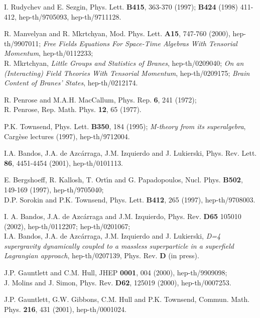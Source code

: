 \documentclass[a4paper,11pt]{article}
\begin{document}
{\begin{thebibliography}{99}
I. Rudychev and E. Sezgin, 
Phys. Lett. {\bf B415},  
363-370 (1997); {\bf B424} (1998) 411-412, 
hep-th/9705093, 
 hep-th/9711128. 

 R. Manvelyan and R. Mkrtchyan, 
Mod. Phys. Lett. {\bf A15}, 747-760 (2000), 
hep-th/9907011; 
{\sl Free Fields Equations For Space-Time Algebras With Tensorial Momentum}, 
hep-th/0112233; \\ 
  R. Mkrtchyan, {\sl Little Groups and Statistics of Branes}, 
hep-th/0209040; {\sl On an (Interacting) Field Theories With 
Tensorial Momentum}, hep-th/0209175; 
{\sl Brain Content of Branes' States}, 
 hep-th/0212174. 


R. Penrose and M.A.H. MacCallum, Phys. Rep. {\bf 6}, 241 (1972); \\
R. Penrose, Rep. Math. Phys. {\bf 12}, 65 (1977).

P.K. Townsend, Phys. Lett. {\bf B350}, 184 (1995); 
{\sl M-theory from its superalgebra},  Carg\`ese lectures
 (1997), hep-th/9712004. 

 I.A. Bandos, J.A. de Azc\'arraga, J.M. Izquierdo and J. Lukierski, 
Phys. Rev. Lett. {\bf 86}, 4451-4454 (2001),  hep-th/0101113. 

 E. Bergshoeff, R. Kallosh, T. Ort\'{\i}n and G. Papadopoulos, 
Nucl. Phys. {\bf B502}, 149-169 
(1997), hep-th/9705040; \\ 
 D.P. Sorokin and P.K. Townsend, 
 Phys. Lett. {\bf B412}, 265 (1997),  hep-th/9708003. 


I. A. Bandos, J.A. de Azc\'arraga and J.M. Izquierdo, 
Phys. Rev. {\bf D65} 105010 (2002),  hep-th/0112207;   
hep-th/0201067; \\ 
I.A. Bandos, J.A. de Azc\'arraga, J.M. Izquierdo and J. Lukierski, 
{\sl D=4 supergravity dynamically coupled to a massless superparticle in 
a superfield Lagrangian approach}, hep-th/0207139, Phys. Rev. {\bf D} 
(in press). 


J.P. Gauntlett and C.M. Hull, JHEP {\bf 0001}, 004 (2000), 
hep-th/9909098; \\ 
J. Molins and J. Simon, Phys. Rev. {\bf D62}, 125019 (2000),
hep-th/0007253. 

J.P. Gauntlett, G.W. Gibbons, C.M. Hull and P.K. Townsend, 
Commun. Math. Phys. {\bf 216}, 431 (2001), hep-th/0001024.


\end{thebibliography}}
\end{document}
